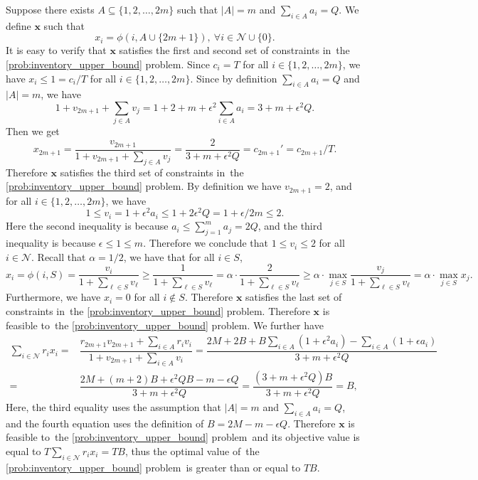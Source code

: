 \documentclass[mnsc,non-blindrev]{informs3}
\theoremstyle{definition}
\begin{document}
\begin{appendices}{\Large{}}
Suppose there exists $A\subseteq\{1,2,\dots,2m\}$ such that $|A|=m$ and $\sum_{i\in A}a_i=Q$. We define $\bm{x}$ such that
\begin{equation*}
x_i=\phi(i,A\cup\{2m+1\}),\ \forall i\in\mathcal{N}\cup\{0\}.
\end{equation*}
It is easy to verify that $\bm{x}$ satisfies the first and second set of constraints in~the \ref{prob:inventory_upper_bound} problem. Since $c_i=T$ for all $i\in\{1,2,\dots,2m\}$, we have $x_i\leq 1=c_i/T$ for all $i\in\{1,2,\dots,2m\}$. Since by definition $\sum_{i\in A}a_i=Q$ and $|A|=m$, we have
\begin{equation*}
1+v_{2m+1}+\sum_{j\in A}v_j=1+2+m+\epsilon^2\sum_{i\in A}a_i=3+m+\epsilon^2Q.
\end{equation*}
Then we get
\begin{equation*}
x_{2m+1}=\dfrac{v_{2m+1}}{1+v_{2m+1}+\sum_{j\in A}v_j}=\dfrac{2}{3+m+\epsilon^2Q}=c_{2m+1}'=c_{2m+1}/T.
\end{equation*}
Therefore $\bm{x}$ satisfies the third set of constraints in~the \ref{prob:inventory_upper_bound} problem. By definition we have $v_{2m+1}=2$, and for all $i\in\{1,2,\dots,2m\}$, we have
\begin{equation*}
1\leq v_{i}=1+\epsilon^2 a_i\leq 1+2\epsilon^2Q=1+\epsilon/2m\leq 2.
\end{equation*}
Here the second inequality is because $a_i\leq\sum_{j=1}^m a_j=2Q$, and the third inequality is because $\epsilon\leq 1\leq m$. Therefore we conclude that $1\leq v_i\leq 2$ for all $i\in\mathcal{N}$. Recall that $\alpha=1/2$, we have that for all $i\in S$,
\begin{equation*}
x_i=\phi(i,S)=\dfrac{v_i}{1+\sum_{\ell\in S}v_\ell}\geq \dfrac{1}{1+\sum_{\ell\in S}v_\ell}=\alpha\cdot \dfrac{2}{1+\sum_{\ell\in S}v_\ell}\geq \alpha\cdot \max_{j\in S}\dfrac{v_j}{1+\sum_{\ell\in S}v_\ell}=\alpha\cdot \max_{j\in S}x_j.
\end{equation*}
Furthermore, we have $x_i=0$ for all $i\notin S$. Therefore $\bm{x}$ satisfies the last set of constraints in~the \ref{prob:inventory_upper_bound} problem. Therefore $\bm{x}$ is feasible to~the \ref{prob:inventory_upper_bound} problem. We further have
\begin{align*}
\sum_{i\in\mathcal{N}}r_ix_i=&\dfrac{r_{2m+1}v_{2m+1}+\sum_{i\in A}r_iv_i}{1+v_{2m+1}+\sum_{i\in A}v_i}
=\dfrac{2M+2B+B\sum_{i\in A}(1+\epsilon^2 a_i)-\sum_{i\in A}(1+\epsilon a_i)}{3+m+\epsilon^2Q}\\
=&\dfrac{2M+(m+2)B+\epsilon^2QB-m-\epsilon Q}{3+m+\epsilon^2Q}=\dfrac{(3+m+\epsilon^2Q)B}{3+m+\epsilon^2Q}=B,
\end{align*}
Here, the third equality uses the assumption that $|A|=m$ and $\sum_{i\in A}a_i=Q$, and the fourth equation uses the definition of $B=2M-m-\epsilon Q$. Therefore $\bm{x}$ is feasible to~the \ref{prob:inventory_upper_bound} problem~and its objective value is equal to $T\sum_{i\in\mathcal{N}}r_ix_i=TB$, thus the optimal value of~the \ref{prob:inventory_upper_bound} problem~is greater than or equal to $TB$.


\end{appendices}
\end{document}
